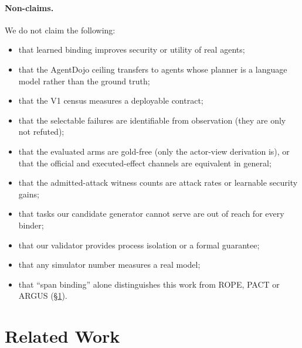 \documentclass{article}
\begin{document}
\paragraph{Non-claims.}
We do not claim the following:
\begin{itemize}
\item that learned binding improves security or utility of real agents;
\item that the AgentDojo ceiling transfers to agents whose planner is a
language model rather than the ground truth;
\item that the V1 census measures a deployable contract;
\item that the selectable failures are identifiable from observation (they
are only not refuted);
\item that the evaluated arms are gold-free (only the actor-view derivation
is), or that the official and executed-effect channels are equivalent in
general;
\item that the admitted-attack witness counts are attack rates or
learnable security gains;
\item that tasks our candidate generator cannot serve are out of reach for
every binder;
\item that our validator provides process isolation or a formal guarantee;
\item that any simulator number measures a real model;
\item that ``span binding'' alone distinguishes this work from ROPE, PACT or
ARGUS (\S\ref{sec:related}).
\end{itemize}

\section{Related Work}
\label{sec:related}
\end{document}
